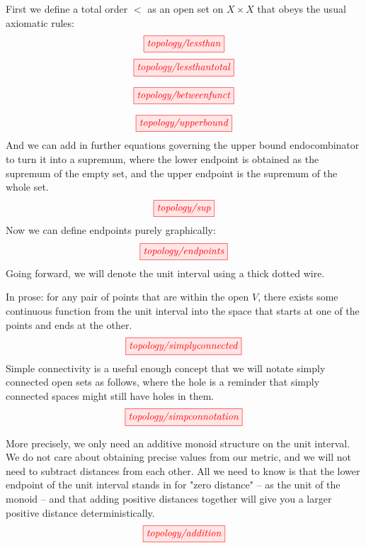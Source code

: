 \begin{myboxR}
\begin{defn}\label{defn:lessthan}
First we define a total order $<$ as an open set on $X \times X$ that obeys the usual axiomatic rules:
\[\tikzfig{topology/lessthan}\]
\[\tikzfig{topology/lessthantotal}\]
\end{defn}
\end{myboxR}

\begin{myboxB}
\begin{defn}
\[\tikzfig{topology/betweenfunct}\]
\end{defn}
\end{myboxB}

\begin{myboxR}
\begin{defn}\label{defn:bounds}
\[\tikzfig{topology/upperbound}\]
And we can add in further equations governing the upper bound endocombinator to turn it into a supremum, where the lower endpoint is obtained as the supremum of the empty set, and the upper endpoint is the supremum of the whole set.
\[\tikzfig{topology/sup}\]
Now we can define endpoints purely graphically:
\[\tikzfig{topology/endpoints}\]
Going forward, we will denote the unit interval using a thick dotted wire.
\end{defn}
\end{myboxR}

\begin{myboxB}
\begin{defn}\label{def:simpconn}
In prose: for any pair of points that are within the open $V$, there exists some continuous function from the unit interval into the space that starts at one of the points and ends at the other.
\[\tikzfig{topology/simplyconnected}\]
Simple connectivity is a useful enough concept that we will notate simply connected open sets as follows, where the hole is a reminder that simply connected spaces might still have holes in them.
\[\tikzfig{topology/simpconnotation}\]
\end{defn}
\end{myboxB}

\begin{myboxR}
\begin{defn}[Addition]\label{def:addition}
More precisely, we only need an additive monoid structure on the unit interval. We do not care about obtaining precise values from our metric, and we will not need to subtract distances from each other. All we need to know is that the lower endpoint of the unit interval stands in for "zero distance" -- as the unit of the monoid -- and that adding positive distances together will give you a larger positive distance deterministically.
\[\tikzfig{topology/addition}\]
\end{defn}
\end{myboxR}

